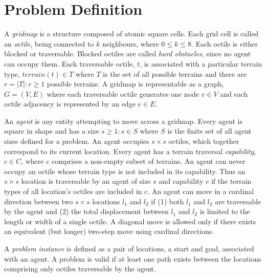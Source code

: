 \section{Problem Definition}
A \emph{gridmap} is a structure composed of atomic square cells.
Each grid cell is called an \emph{octile}, being connected to $k$ neighbours, where  $0 \leq k \leq 8$. 
Each octile is either blocked or traversable. 
Blocked octiles are called \emph{hard obstacles}, since no agent can occupy them.
Each traversable octile, $t$, is associated with a particular terrain type, $terrain(t) \in T$ where $T$ is the set of all possible terrains and there are $r = |T| : r \geq 1$ possible terrains.
A gridmap is representable as a graph, $G = (V, E)$ where each traversable octile generates one node $v \in V$ and each octile adjacency is represented by an edge $e \in E$.
\par \indent
An \emph{agent} is any entity attempting to move across a gridmap. 
Every agent is square in shape and has a size $s \geq 1 : s \in S$ where $S$ is the finite set of all agent sizes defined for a problem.
An agent occupies $s \times s$ octiles, which together correspond to its current location. 
Every agent has a terrain traversal \emph{capability}, $c \in C$, where $c$ comprises a non-empty subset of terrains.
An agent can never occupy an octile whose terrain type is not included in its capability.
Thus an $s \times s$ location is traversable by an agent of size $s$ and capability $c$ if the terrain types of all location's octiles are included in $c$.
An agent can move in a cardinal direction between two $s \times s$ locations $l_1$ and $l_2$ if (1) both $l_1$ and $l_2$ are traversable by the agent and (2) the total displacement between $l_1$ and $l_2$ is limited to the length or width of a single octile. 
A diagonal move is allowed only if there exists an equivalent (but longer) two-step move using cardinal directions.
%
%
\par \indent
A \emph{problem instance} is defined as a pair of locations, a start and goal, associated with an agent. A problem is valid if at least one path exists between the locations comprising only octiles traversable by the agent. 
